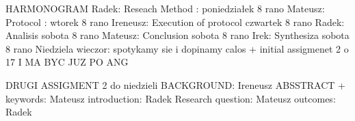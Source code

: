 \documentclass[times, 10pt,twocolumn]{article}
\begin{document}
\nocite{ex1,ex2}
 

HARMONOGRAM
Radek: Reseach Method : poniedziałek 8 rano
Mateusz: Protocol : wtorek 8 rano
Ireneusz: Execution of protocol czwartek 8 rano
Radek: Analisis sobota 8 rano
Mateusz: Conclusion sobota 8 rano
Irek: Synthesiza sobota 8 rano
Niedziela wieczor: spotykamy sie i dopinamy calos + initial assigmenet 2 o 17 I MA BYC JUZ PO ANG


DRUGI
ASSIGMENT 2 do niedzieli
BACKGROUND: Ireneusz
ABSSTRACT + keywords: Mateusz
introduction: Radek
Research question: Mateusz
outcomes: Radek
\end{document}
